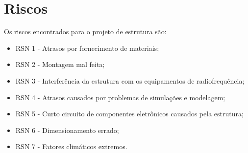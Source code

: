 \section{Riscos}

Os riscos encontrados para o projeto de estrutura são:

\begin{itemize}
\item RSN 1 - Atrasos por fornecimento de materiais;
\item RSN 2 - Montagem mal feita;
\item RSN 3 - Interferência da estrutura com os equipamentos de radiofrequência;
\item RSN 4 - Atrasos causados por problemas de simulações e modelagem;
\item RSN 5 - Curto circuito de componentes eletrônicos causados pela estrutura;
\item RSN 6 - Dimensionamento errado;
\item RSN 7 - Fatores climáticos extremos.
\end{itemize}



